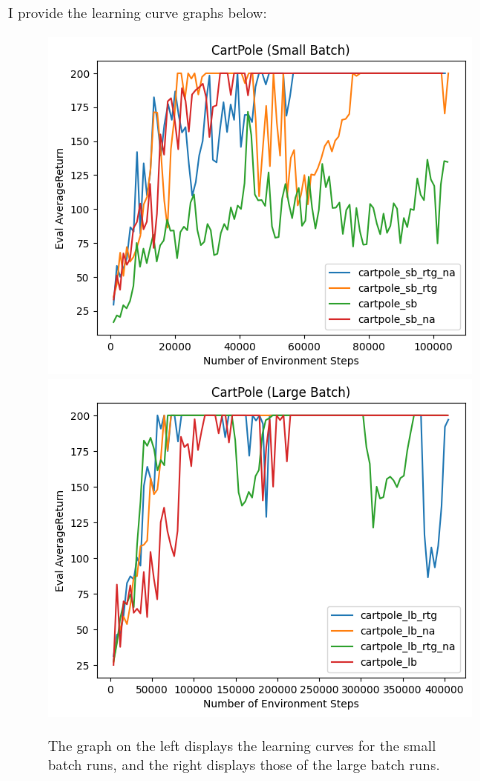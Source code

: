 \documentclass{article}
\begin{document}
\begin{sol}
    I provide the learning curve graphs below:
    \begin{figure}[h!]
        \begin{center}
        \includegraphics[width=\textwidth/9*4]{q3_cartpole_small_batch.png}
        \hspace*{1cm}
        \includegraphics[width=\textwidth/9*4]{q3_cartpole_large_batch.png}
        \end{center}
        \caption{\color{darkblue}The graph on the left displays the learning curves for the small batch runs, and the right displays those of the large batch runs.}
    \end{figure}


\end{sol}
\end{document}
